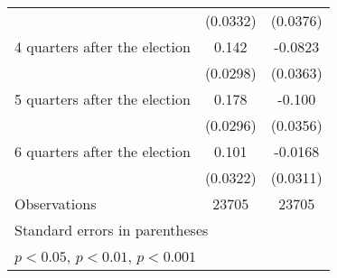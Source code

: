 \begin{table}[htbp]
\begin{tabular}{l*{2}{c}}
                    &    (0.0332)         &    (0.0376)         \\
[1em]
 4 quarters after the election&       0.142\sym{***}&     -0.0823\sym{*}  \\
                    &    (0.0298)         &    (0.0363)         \\
[1em]
 5 quarters after the election&       0.178\sym{***}&      -0.100\sym{**} \\
                    &    (0.0296)         &    (0.0356)         \\
[1em]
 6 quarters after the election&       0.101\sym{**} &     -0.0168         \\
                    &    (0.0322)         &    (0.0311)         \\
\hline
Observations        &       23705         &       23705         \\
\hline\hline
\multicolumn{3}{l}{\footnotesize Standard errors in parentheses}\\
\multicolumn{3}{l}{\footnotesize \sym{*} \(p<0.05\), \sym{**} \(p<0.01\), \sym{***} \(p<0.001\)}\\
\end{tabular}
\end{table}
